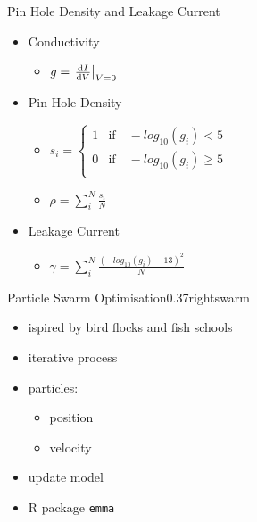 \documentclass[hyperref={pdfpagelabels=false}, aspectratio=43, t]{beamer}  %
\begin{document}
\begin{frame}{Pin Hole Density and Leakage Current}
	\vspace{2em}
	\begin{itemize}
		\item Conductivity
			\begin{itemize}
				\item $
					g = \eval{\dv{I}{V}}_{V =0}
					$
			\end{itemize}
	\vspace{0.5em}
	\pause
		\item Pin Hole Density 
			\begin{itemize}
				\item $
	s_i = \begin{cases}
        1 &\text{if} \quad -log_{10}(g_i) < 5 \\
        0 &\text{if} \quad -log_{10}(g_i) \geq 5 \\
	\end{cases}
					$
				\item $
	\rho = \sum_i^N \frac{s_i}{N}
					$
			\end{itemize}
	\vspace{0.5em}
	\pause
		\item Leakage Current 
			\begin{itemize}
				\item $
    \gamma = \sum_i^N \frac{ (-log_{10}(g_i) - 13)^2}{N}
	$
			\end{itemize}
	\end{itemize}
\end{frame}
\begin{graphicsFrame}{Particle Swarm Optimisation}{}{0.37}{right}{swarm}{}
	\vspace{2em}
	\begin{itemize}
		\item ispired by bird flocks and fish schools %
		\item iterative process %
		\item particles: 
			\begin{itemize}
				\item position 
				\item velocity
			\end{itemize}
		\item update model
		\item R package \texttt{emma} 
	\end{itemize}
\end{graphicsFrame}
\end{document}
